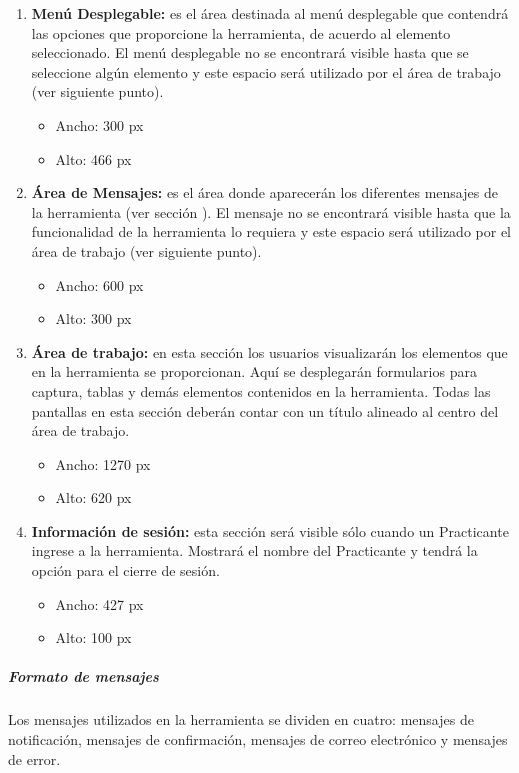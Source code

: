 \begin{enumerate} 
	\item \textbf{Menú Desplegable:} es el área destinada al menú desplegable que contendrá las opciones que proporcione la herramienta, de acuerdo al elemento seleccionado.
	El menú desplegable no se encontrará visible hasta que se seleccione algún elemento y este espacio será utilizado por el área de trabajo (ver siguiente punto).
	\begin{itemize}
		\item Ancho: 300 px
		\item Alto: 466 px
	\end{itemize} 	
	
	\item \textbf{Área de Mensajes:} es el área donde aparecerán los diferentes mensajes de la herramienta (ver sección ).
	El mensaje no se encontrará visible hasta que la funcionalidad de la herramienta lo requiera y este espacio será utilizado por el área de trabajo (ver siguiente punto).
	\begin{itemize}
		\item Ancho: 600 px
		\item Alto: 300 px
	\end{itemize} 
	
	\item \textbf{Área de trabajo:} en esta sección los usuarios visualizarán los elementos que en la herramienta se proporcionan. Aquí se desplegarán formularios para captura, tablas y demás elementos contenidos en la herramienta.
	Todas las pantallas en esta sección deberán contar con un título alineado al centro del área de trabajo.
	\begin{itemize}
		\item Ancho: 1270 px
		\item Alto: 620 px
	\end{itemize} 
	
	\item \textbf{Información de sesión:} esta sección será visible sólo cuando un Practicante ingrese a la herramienta.
	Mostrará el nombre del Practicante y tendrá la opción para el cierre de sesión. 
	\begin{itemize}
		\item Ancho: 427 px
		\item Alto: 100 px
	\end{itemize} 
\end{enumerate}


\subparagraph{Formato de mensajes} 
Los mensajes utilizados en la herramienta se dividen en cuatro: mensajes de notificación, mensajes de confirmación, mensajes de correo electrónico y mensajes de error. \\


